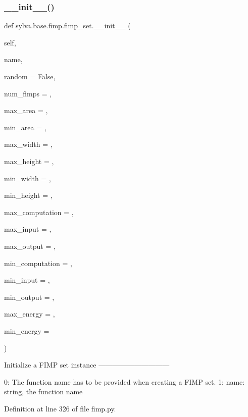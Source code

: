 \subsubsection{\texorpdfstring{\+\_\+\+\_\+init\+\_\+\+\_\+()}{\_\_init\_\_()}}
{\footnotesize\ttfamily def sylva.\+base.\+fimp.\+fimp\+\_\+set.\+\_\+\+\_\+init\+\_\+\+\_\+ (\begin{DoxyParamCaption}\item[{}]{self,  }\item[{}]{name,  }\item[{}]{random = {\ttfamily False},  }\item[{}]{num\+\_\+fimps = {},  }\item[{}]{max\+\_\+area = {},  }\item[{}]{min\+\_\+area = {},  }\item[{}]{max\+\_\+width = {},  }\item[{}]{max\+\_\+height = {},  }\item[{}]{min\+\_\+width = {},  }\item[{}]{min\+\_\+height = {},  }\item[{}]{max\+\_\+computation = {},  }\item[{}]{max\+\_\+input = {},  }\item[{}]{max\+\_\+output = {},  }\item[{}]{min\+\_\+computation = {},  }\item[{}]{min\+\_\+input = {},  }\item[{}]{min\+\_\+output = {},  }\item[{}]{max\+\_\+energy = {},  }\item[{}]{min\+\_\+energy = {} }\end{DoxyParamCaption})}

\begin{DoxyVerb}  Initialize a FIMP set instance
  ------------------------------

  0: The function name has to be provided when creating a FIMP set.
  1: name: string, the function name
\end{DoxyVerb}
 

Definition at line 326 of file fimp.\+py.


